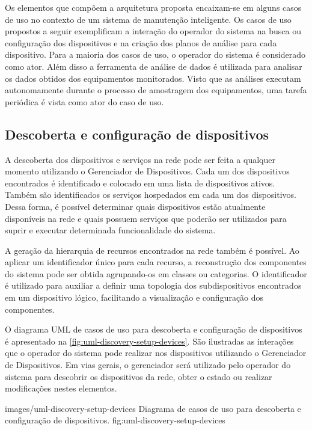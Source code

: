 Os elementos que compõem a arquitetura proposta encaixam-se em alguns casos de uso no contexto de um
sistema de manutenção inteligente. Os casos de uso propostos a seguir exemplificam a interação do
operador do sistema na busca ou configuração dos dispositivos e na criação dos planos de análise
para cada dispositivo. Para a maioria dos casos de uso, o operador do sistema é considerado como
ator. Além disso a ferramenta de análise de dados é utilizada para analisar os dados obtidos dos
equipamentos monitorados. Visto que as análises executam autonomamente durante o processo de
amostragem dos equipamentos, uma tarefa periódica é vista como ator do caso de uso.


\subsection{Descoberta e configuração de dispositivos}

A descoberta dos dispositivos e serviços na rede pode ser feita a qualquer momento utilizando o
Gerenciador de Dispositivos. Cada um dos dispositivos encontrados é identificado e colocado em uma
lista de dispositivos ativos. Também são identificados os serviços hospedados em cada um dos
dispositivos. Dessa forma, é possível determinar quais dispositivos estão atualmente disponíveis na
rede e quais possuem serviços que poderão ser utilizados para suprir e executar determinada
funcionalidade do sistema.

A geração da hierarquia de recursos encontrados na rede também é possível. Ao aplicar um
identificador único para cada recurso, a reconstrução dos componentes do sistema pode ser obtida
agrupando-os em classes ou categorias. O identificador é utilizado para auxiliar a definir uma
topologia dos subdispositivos encontrados em um dispositivo lógico, facilitando a visualização e
configuração dos componentes.

O diagrama \gls{UML} de casos de uso para descoberta e configuração de dispositivos é apresentado na
\cref{fig:uml-discovery-setup-devices}. São ilustradas as interações que o operador do sistema pode
realizar nos dispositivos utilizando o Gerenciador de Dispositivos. Em vias gerais, o gerenciador
será utilizado pelo operador do sistema para descobrir os dispositivos da rede, obter o estado ou
realizar modificações nestes elementos.

  {images/uml-discovery-setup-devices}
  {Diagrama de casos de uso para descoberta e configuração de dispositivos.}
  {fig:uml-discovery-setup-devices}

